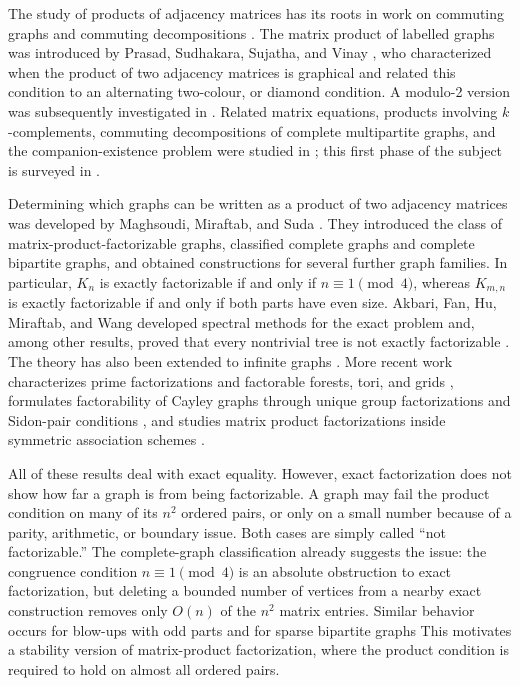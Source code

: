 \documentclass{file}
\begin{document}
The study of products of adjacency matrices has its roots in work on
commuting graphs and commuting decompositions
\cite{akbari2007commuting,akbari2009commutativity,somodi2017construction}.
The matrix product of labelled graphs was introduced by Prasad, Sudhakara,
Sujatha, and Vinay \cite{prasad2013matrix}, who characterized when the product of two adjacency matrices is graphical and related this condition to an alternating two-colour, or diamond condition.  A
modulo-2 version was subsequently investigated in
\cite{prasad2014modulo}. Related matrix equations, products involving $k$-complements, commuting decompositions of complete multipartite graphs,
and the companion-existence problem were studied in
\cite{bhat2016matrix,bhat2018commuting,bhat2022algorithm}; this first phase
of the subject is surveyed in \cite{sudhakara2023products}.

Determining which graphs can be written as a product of two adjacency matrices was developed by Maghsoudi, Miraftab, and Suda \cite{maghsoudi2023matrix}. They introduced
the class of matrix-product-factorizable graphs, classified complete graphs
and complete bipartite graphs, and obtained constructions for several further graph families. In particular, $K_n$ is exactly factorizable if and only if $n\equiv 1\pmod 4$, whereas $K_{m,n}$ is exactly
factorizable if and only if both parts have even size. Akbari, Fan, Hu, Miraftab, and Wang developed spectral methods for the exact problem and,
among other results, proved that every nontrivial tree is not exactly factorizable \cite{miraftab2025factorability}. The theory has also been extended to infinite graphs \cite{miraftab2026infinite}.  More recent work
characterizes prime factorizations and factorable forests, tori, and grids
\cite{akbari2025prime}, formulates factorability of Cayley graphs through unique group factorizations and Sidon-pair conditions
\cite{herman2025cayley}, and studies matrix product factorizations inside symmetric association schemes \cite{herman2026association}.

All of these results deal with exact equality. However, exact factorization does not show how far a graph is from being factorizable. A graph may fail the product condition on many of its $n^2$ ordered pairs, or only on a small number because of a parity, arithmetic, or boundary issue. Both cases are simply called “not factorizable.” The
complete-graph classification already suggests the issue: the congruence
condition $n\equiv1\pmod4$ is an absolute obstruction to exact
factorization, but deleting a bounded number of vertices from a nearby exact
construction removes only $O(n)$ of the $n^2$ matrix entries. Similar behavior occurs for blow-ups with odd parts and for sparse bipartite graphs
This motivates a stability version of matrix-product factorization, where the product condition is required to hold on almost all ordered pairs.
\end{document}
